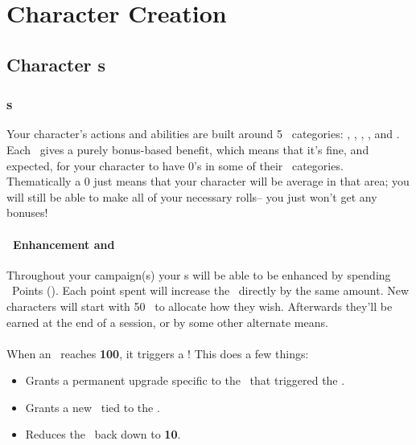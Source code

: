 \part{Character Creation}\label{part:char_creation}
\chapter{Character \attribute s}\label{ch:char_attributes}

\section{\attribute s}\label{sec:attributes}
Your character's actions and abilities are built around 5 \attribute\ 
categories: \POWEful, \KNOWful, \ENDUful, \SPEDful, and \FOREful. Each \attribute\  gives a purely
bonus-based benefit, which means that it's fine, and expected, for
your character to have 0's in some of their \attribute\  categories.
Thematically a 0 just means that your character will be average in that
area; you will still be able to make all of your necessary rolls--
you just won't get any bonuses! 

\subsection{\attribute\ Enhancement and \attrval}\label{subsec:attr_points}
Throughout your campaign(s) your \attribute s will be able to be enhanced by spending \attribute\ Points (\attrval). Each point spent will increase the \attribute\ directly by the same amount. New characters will start with 50 \attrval\ to allocate how they wish. Afterwards they'll be earned at the end of a session, or by some other alternate means.


\subsection{\BURST\index{\BURST}}\label{subsec:BURST}
When an \attribute\ reaches \textbf{100}, it triggers a \BURST !
This does a few things:
\begin{itemize}
\item Grants a permanent upgrade specific to the \attribute\ that triggered the \BURST .
\item Grants a new \techn\ tied to the \attribute.
\item Reduces the \attribute\ back down to \textbf{10}.
\end{itemize}

